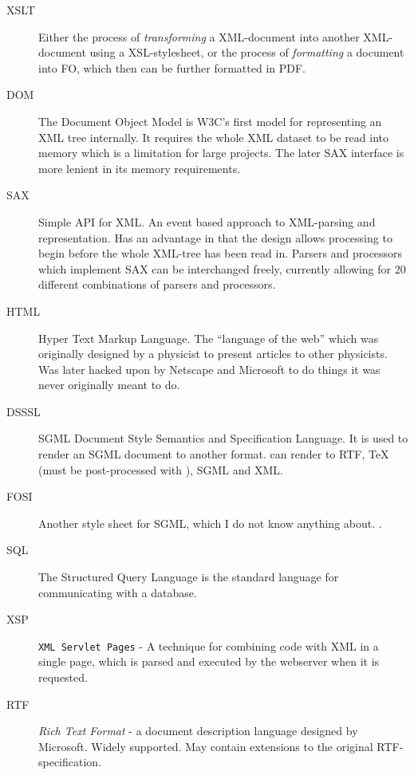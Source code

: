 \begin{description}
\item[XSLT] Either the process of \textit{transforming} a XML-document into
  another XML-document using a XSL-stylesheet, or the process of
  \textit{formatting} a document into FO, which then can be further
  formatted in PDF.
  
\item[DOM] The Document Object Model is W3C's first model for
  representing an XML tree internally.  It requires the whole XML
  dataset to be read into memory which is a limitation for large
  projects.  The later SAX interface is more lenient in its memory
  requirements.
  
\item[SAX] Simple API for XML.  An event based approach to XML-parsing
  and representation.  Has an advantage in that the design allows
  processing to begin before the whole XML-tree has been read in.
  Parsers and processors which implement SAX can be interchanged
  freely, currently allowing for 20 different combinations of parsers
  and processors.


\item[HTML] Hyper Text Markup Language.  The ``language of the web''
  which was originally designed by a physicist to present articles to
  other physicists.  Was later hacked upon by Netscape and Microsoft
  to do things it was never originally meant to do.

  
\item[DSSSL] SGML Document Style Semantics and Specification Language.
  It is used to render an SGML document to another format.
   can render to RTF, {\TeX} (must be
  post-processed with ), SGML and XML.
  
\item[FOSI] Another style sheet for SGML, which I do not know anything
  about.
  .

  
\item[SQL] The Structured Query Language is the standard
  language for communicating with a database.

  
\item[XSP] \texttt{XML Servlet Pages} - A technique for combining code
  with XML in a single page, which is parsed and executed by the
  webserver when it is requested.
  
\item[RTF] \textit{Rich Text Format} - a document description language
  designed by Microsoft.  Widely supported.  May contain extensions to
  the original RTF-specification.


\end{description}
